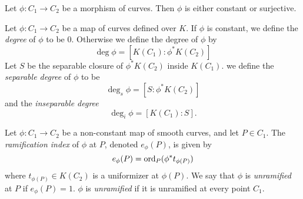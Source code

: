 \begin{theorem}
	Let $\phi: C_1 \to C_2$ be a morphism of curves. Then $\phi$ is either
	constant or surjective.
\end{theorem}

\begin{definition}
	Let $\phi: C_1 \to C_2$ be a map of curves defined over $K$.
	If $\phi$ is constant, we define the \emph{degree} of $\phi$ to be $0$.
	Otherwise we define the degree of $\phi$ by
	\begin{equation*}
		\deg\phi = [K(C_1): \phi^*K(C_2)]
	\end{equation*}
	Let $S$ be the separable closure of $\phi^*K(C_2)$ inside $K(C_1)$.
	we define the \emph{separable degree} of $\phi$ to be
	\begin{equation*}
		\deg_s\phi = [S: \phi^*K(C_2)]
	\end{equation*}
	and the \emph{inseparable degree}
	\begin{equation*}
		\deg_i\phi = [K(C_1): S].
	\end{equation*}
\end{definition}


\begin{definition}
	Let $\phi: C_1 \to C_2$ be a non-constant map of smooth curves, and let
	$P \in C_1$. The \emph{ramification index} of $\phi$ at $P$, denoted
	$e_\phi(P)$, is given by
	\begin{equation*}
		e_\phi(P) = \operatorname{ord}_P(\phi^*t_{\phi(P)})
	\end{equation*}
	where $t_{\phi(P)} \in K(C_2)$ is a uniformizer at $\phi(P)$.
	We say that $\phi$ is \emph{unramified} at $P$ if $e_\phi(P) = 1$. $\phi$ is
	\emph{unramified} if it is unramified at every point $C_1$.
\end{definition}


